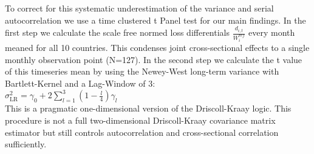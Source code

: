 %

To correct for this systematic underestimation of the variance and serial autocorrelation we use a time clustered t Panel test for our main findings. In the first step we calculate the scale free normed loss differentials $\frac{d_{i,t}}{W^{ref}_{i}}$ every month meaned for all 10 countries. This condenses joint cross-sectional effects to a single monthly observation point (N=127). In the second step we calculate the t value of this timeseries mean by using the Newey-West long-term variance \parencite{newey1987} with Bartlett-Kernel and a Lag-Window of 3:\\
  
$\sigma^2_{\text{LR}} = \gamma_0 + 2 \sum_{l=1}^{3} \left(1 - \frac{l}{4}\right) \gamma_l$\\

This is a pragmatic one-dimensional version of the Driscoll-Kraay logic. This procedure is not a full two-dimensional Driscoll-Kraay covariance matrix estimator but still controls autocorrelation and cross-sectional correlation sufficiently.

